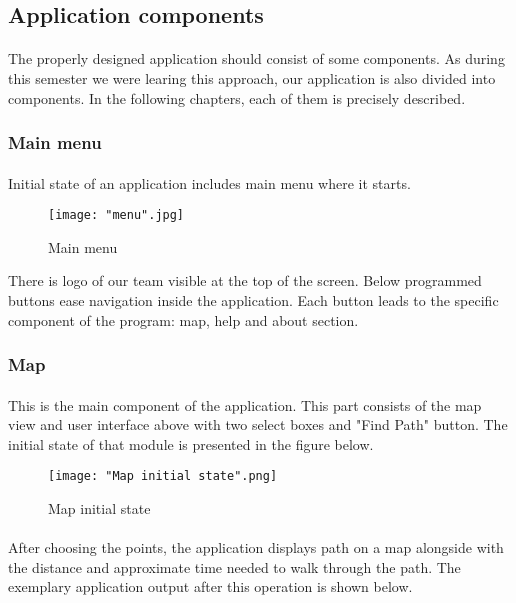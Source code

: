 \documentclass[12pt]{article}
\begin{document}
\subsection{Application components}
\paragraph{}The properly designed application should consist of some components. As during this semester we were learing this approach, our application is also divided into components. In the following chapters, each of them is precisely described.
\cleardoublepage
\subsubsection{Main menu}
\paragraph{}
Initial state of an application includes main menu where it starts.

\begin{figure}[H]
\centerline{\texttt{[image: "menu".jpg]}}
\caption{Main menu}
\label{fig:menuComponent}
\end{figure}

There is logo of our team visible at the top of the screen. Below programmed buttons ease navigation inside the application.
Each button leads to the specific component of the program: map, help and about section.

\subsubsection{Map}
\paragraph{} This is the main component of the application. This part consists of the map view and user interface above with two select boxes and "Find Path" button. The initial state of that module is presented in the figure below.

\begin{figure}[H]
\centerline{\texttt{[image: "Map initial state".png]}}
\caption{Map initial state}
\label{fig:MapInitial}
\end{figure}

\paragraph{} After choosing the points, the application displays path on a map alongside with the distance and approximate time needed to walk through the path. The exemplary application output after this operation is shown below.
\end{document}
